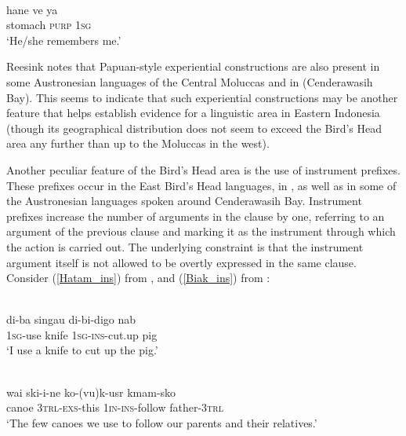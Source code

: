 \ea \label{wooi_hane}
\\
\gll hane ve ya \\
stomach \textsc{purp} \textsc{1}\textsc{sg} \\
\glft `He/she remembers me.'\\ 
\z

Reesink notes that Papuan-style experiential constructions are also present in some Austronesian languages of the Central Moluccas and in  (Cenderawasih Bay). This seems to indicate that such experiential constructions may be another feature that helps establish evidence for a linguistic area in Eastern Indonesia (though its geographical distribution does not seem to exceed the Bird's Head area any further than up to the Moluccas in the west).

Another peculiar feature of the Bird's Head area is the use of instrument prefixes. These prefixes occur in the East Bird's Head languages, in , as well as in some of the Austronesian languages spoken around Cenderawasih Bay. Instrument prefixes increase the number of arguments in the clause by one, referring to an argument of the previous clause and marking it as the instrument through which the action is carried out. The underlying constraint is that the instrument argument itself is not allowed to be overtly expressed in the same clause. Consider (\ref{Hatam_ins}) from , and (\ref{Biak_ins}) from :

\ea \label{Hatam_ins}
\\
\gll di-ba singau di-bi-digo nab \\
\textsc{1}\textsc{sg}-use knife \textsc{1}\textsc{sg}-\textsc{ins}-cut.up pig \\
\glft `I use a knife to cut up the pig.'\\ 
\z

\ea \label{Biak_ins}
\\
\gll wai ski-i-ne ko-(vu)k-usr kmam-sko \\
canoe \textsc{3}\textsc{trl}-\textsc{exs}-this \textsc{1}\textsc{in}-\textsc{ins}-follow father-\textsc{3}\textsc{trl} \\
\glft `The few canoes we use to follow our parents and their relatives.'\\ 
\z

